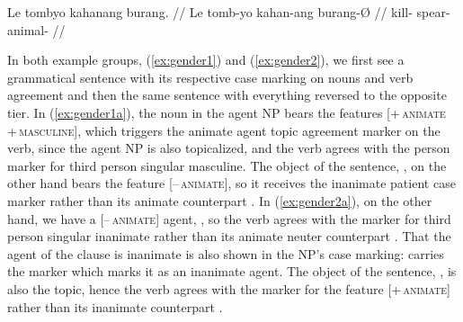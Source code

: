\a\label{ex:gender2b}\begingl
	\gla *Le tombyo kahanang burang. //
	\glb *Le tomb-yo kahan-ang burang-Ø //
	\glc *\PatTI{} kill-\TsgN{} spear-\AargI{} animal-\Top{} //
\endgl
\xe

In both example groups, (\ref{ex:gender1}) and (\ref{ex:gender2}), we first see 
a grammatical sentence with its respective case marking on nouns and verb 
agreement and then the same sentence with everything reversed to the opposite 
tier. In (\ref{ex:gender1a}), the noun in the agent NP 
 bears the features 
\textsc{[+\,animate +\,masculine]}, which triggers the animate agent topic 
agreement marker  on the verb, since the agent NP is also 
topicalized, and the verb agrees with the person marker  
for third person singular masculine. The object of the sentence, 
, on the other hand bears the feature 
\textsc{[–\,animate]}, so it receives the inanimate patient case marker 
 rather than its animate counterpart . In 
(\ref{ex:gender2a}), on the other hand, we have a \textsc{[–\,animate]} agent, 
, so the verb agrees with the marker  
for third person singular inanimate rather than its animate 
neuter counterpart . That the agent of the clause is inanimate 
is also shown in the NP's case marking:  carries the marker 
 which marks it as an inanimate agent. The object of the 
sentence, , is also the topic, hence the verb 
agrees with the marker  for the feature \textsc{[+\,animate]} 
rather than its inanimate counterpart .


